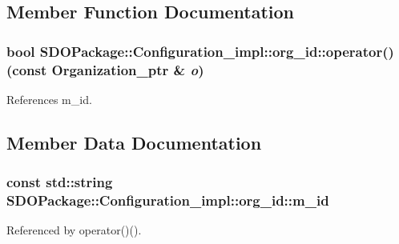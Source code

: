 \subsection{Member Function Documentation}
\subsubsection[{operator()}]{\setlength{\rightskip}{0pt plus 5cm}bool SDOPackage::Configuration\_\-impl::org\_\-id::operator() (const Organization\_\-ptr \& {\em o})\hspace{0.3cm}{\ttfamily  [inline]}}\label{structSDOPackage_1_1Configuration__impl_1_1org__id_a2dc65ad9e9877d9952d5b4a63540ba29}


References m\_\-id.



\subsection{Member Data Documentation}
\subsubsection[{m\_\-id}]{\setlength{\rightskip}{0pt plus 5cm}const std::string {\bf SDOPackage::Configuration\_\-impl::org\_\-id::m\_\-id}}\label{structSDOPackage_1_1Configuration__impl_1_1org__id_af70e2718d906e5f1203bfe2d554e0b73}


Referenced by operator()().


